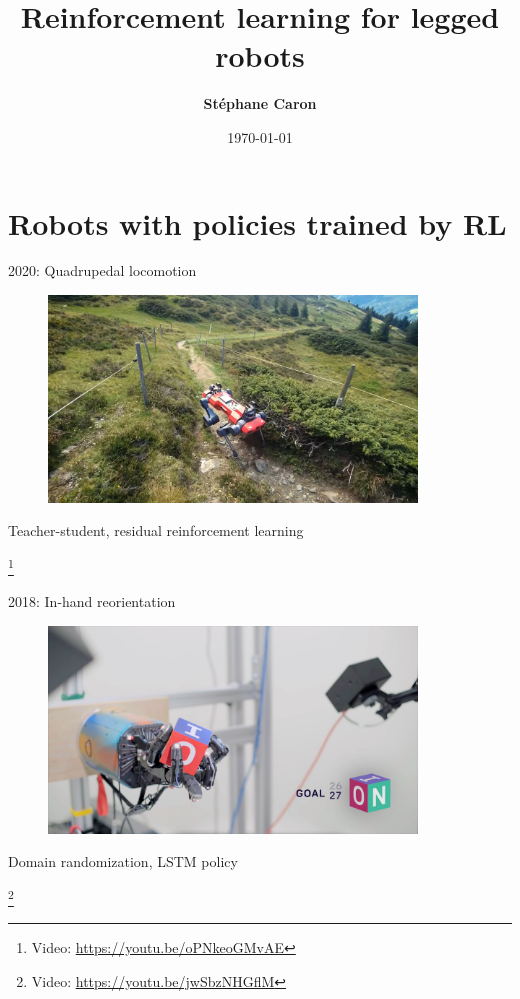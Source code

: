 \documentclass[11pt, aspectratio=169]{beamer}
\title{
    Reinforcement learning for legged robots
}
\author{\textbf{St\'ephane Caron}}
\date{\today}
\institute{Inria--\'{E}cole normale sup\'{e}rieure}
\newcommand\blfootnote[1]{%
  \begingroup
  \renewcommand\thefootnote{}%
  \footnote{#1}%
  \addtocounter{footnote}{-1}%
  \endgroup
}
\begin{document}
\maketitle


\section*{Robots with policies trained by RL}

\begin{frame}{2020: Quadrupedal locomotion~\cite{lee2020}}
    \vspace{1.5em}
    \begin{figure}
        \includegraphics[height=5.5cm]{figures/hike-with-anymal.jpg}
    \end{figure}
    \begin{center}
        Teacher-student, residual reinforcement learning
    \end{center}
    \blfootnote{
        Video: \url{https://youtu.be/oPNkeoGMvAE}
    }
\end{frame}

\begin{frame}{2018: In-hand reorientation}
    \vspace{1.5em}
    \begin{figure}
        \includegraphics[height=5.5cm]{figures/in-hand-reorientation.jpg}
    \end{figure}
    \begin{center}
        Domain randomization, LSTM policy
    \end{center}
    \blfootnote{
        Video: \url{https://youtu.be/jwSbzNHGflM}
    }
\end{frame}
\end{document}
